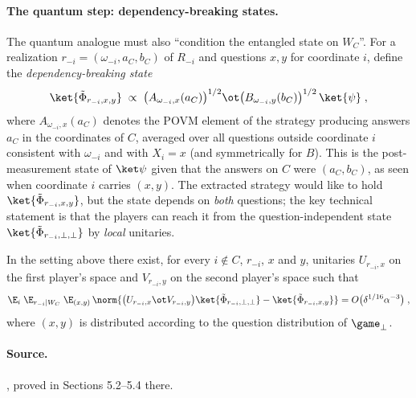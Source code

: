 \paragraph{The quantum step: dependency-breaking states.} The quantum analogue must
also ``condition the entangled state on $W_C$''. For a realization $r_{-i} =
(\omega_{-i}, a_C, b_C)$ of $R_{-i}$ and questions $x, y$ for coordinate $i$, define
the \emph{dependency-breaking state}
\begin{equation*}
  \ket{\tilde\Phi_{r_{-i}, x, y}} \;\propto\; \bigl( A_{\omega_{-i}, x}(a_C)
  \bigr)^{1/2} \ot \bigl( B_{\omega_{-i}, y}(b_C) \bigr)^{1/2} \, \ket{\psi}\;,
\end{equation*}
where $A_{\omega_{-i}, x}(a_C)$ denotes the POVM element of the strategy producing
answers $a_C$ in the coordinates of $C$, averaged over all questions outside
coordinate $i$ consistent with $\omega_{-i}$ and with $X_i = x$ (and symmetrically for
$B$). This is the post-measurement state of $\ket\psi$ given that the answers on $C$
were $(a_C, b_C)$, as seen when coordinate $i$ carries $(x, y)$. The extracted
strategy would like to hold $\ket{\tilde\Phi_{r_{-i}, x, y}}$, but the state depends
on \emph{both} questions; the key technical statement is that the players can reach it
from the question-independent state $\ket{\tilde\Phi_{r_{-i}, \perp, \perp}}$ by
\emph{local} unitaries.

\effortHard

\begin{lemma}
\label{lem:local-unitaries}
In the setting above there exist, for every $i \notin C$, $r_{-i}$, $x$ and $y$,
unitaries $U_{r_{-i}, x}$ on the first player's space and $V_{r_{-i}, y}$ on the
second player's space such that
\begin{equation*}
  \E_{i} \; \E_{r_{-i} | W_C} \; \E_{(x,y)} \, \norm{ \bigl( U_{r_{-i}, x} \ot
  V_{r_{-i}, y} \bigr) \ket{\tilde\Phi_{r_{-i}, \perp, \perp}} -
  \ket{\tilde\Phi_{r_{-i}, x, y}} } = O\bigl( \delta^{1/16} \alpha^{-3} \bigr)\;,
\end{equation*}
where $(x, y)$ is distributed according to the question distribution of
$\game_\perp$.
\end{lemma}

\paragraph{Source.} \cite[Proposition 5.1]{BVY17}, proved in Sections 5.2--5.4 there.

